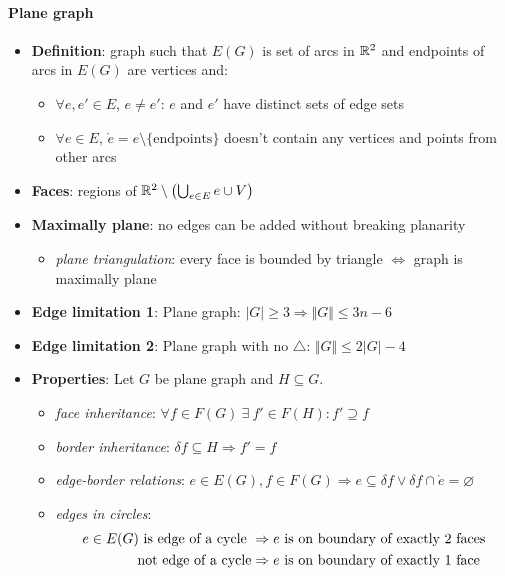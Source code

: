 \paragraph{Plane graph}
\begin{itemize}
  \item \textbf{Definition}: graph such that $ E(G) $ is set of arcs in $ \mathbb{R}^2 $ and endpoints of arcs in $ E(G) $ are vertices and:
  \begin{itemize}
    \item $ \forall e, e' \in E $, $ e \neq e' $: $ e $ and $ e' $ have distinct sets of edge sets
    \item $ \forall e \in E $, $ \mathring{e} = e \setminus \{ \text{endpoints} \} $ doesn't contain any vertices and points from other arcs 
  \end{itemize}
  \item \textbf{Faces}: regions of $ \mathbb{R}^2 \setminus \left( \bigcup_{e \in E} e \cup V \right) $
  \item \textbf{Maximally plane}: no edges can be added without breaking planarity
  \begin{itemize}
    \item \emph{plane triangulation}: every face is bounded by triangle $ \Leftrightarrow $ graph is maximally plane 
  \end{itemize}
  \item \textbf{Edge limitation 1}: Plane graph: $ \vert G \vert \geq 3 \Rightarrow \Vert G \Vert \leq 3n-6 $
  \item \textbf{Edge limitation 2}: Plane graph with no $ \triangle $: $ \Vert G \Vert \leq 2\vert G \vert - 4 $
  \item \textbf{Properties}: Let $ G $ be plane graph and $ H \subseteq G $.
  \begin{itemize}
    \item \emph{face inheritance}: $ \forall f \in F(G) \ \exists \ f' \in F(H) : f' \supseteq f $ 
    \item \emph{border inheritance}: $ \delta f \subseteq H \Rightarrow f' = f $
    \item \emph{edge-border relations}: $ e \in E(G), f \in F(G) \Rightarrow e \subseteq \delta f \vee \delta f \cap \mathring{e} = \varnothing $
    \item \emph{edges in circles}:
      \begin{align*}
        e \in E(G) \text{ is edge of a cycle } &\Rightarrow e \text{ is on boundary of exactly $ 2 $ faces} \\
          \text{ not edge of a cycle} &\Rightarrow e \text{ is on boundary of exactly $ 1 $ face}

\end{align*}
\end{itemize}
\end{itemize}
